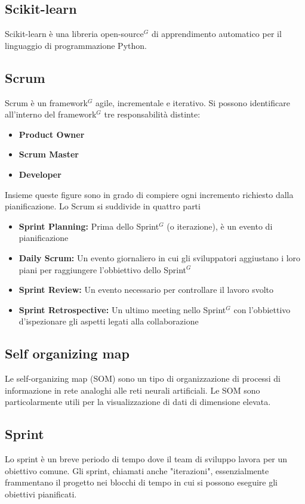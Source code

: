 \subsection{Scikit-learn}
Scikit-learn è una libreria open-source$^{G}$ di apprendimento automatico per il linguaggio di programmazione Python.

\subsection{Scrum}
Scrum è un framework$^{G}$ agile, incrementale e iterativo.\newline
Si possono identificare all'interno del framework$^{G}$ tre responsabilità distinte:
\begin{itemize}
    \item \textbf{Product Owner}
    \item \textbf{Scrum Master}
    \item \textbf{Developer}
\end{itemize}
Insieme queste figure sono in grado di compiere ogni incremento richiesto dalla pianificazione.
\newline
Lo Scrum si suddivide in quattro parti
\begin{itemize}
    \item \textbf{Sprint Planning:} Prima dello Sprint$^{G}$ (o iterazione), è un evento di pianificazione
    \item \textbf{Daily Scrum:} Un evento giornaliero in cui gli sviluppatori aggiustano i loro piani per raggiungere l'obbiettivo dello Sprint$^{G}$
    \item \textbf{Sprint Review:} Un evento necessario per controllare il lavoro svolto
    \item \textbf{Sprint Retrospective:} Un ultimo meeting nello Sprint$^{G}$ con l'obbiettivo d'ispezionare gli aspetti legati alla collaborazione
\end{itemize}

\subsection{Self organizing map}
Le self-organizing map (SOM) sono un tipo di organizzazione di processi di informazione in rete analoghi alle reti neurali artificiali. Le SOM sono particolarmente utili per la visualizzazione di dati di dimensione elevata.

\subsection{Sprint}
Lo sprint è un breve periodo di tempo dove il team di sviluppo lavora per un obiettivo comune. Gli sprint, chiamati anche
"iterazioni", essenzialmente frammentano il progetto nei blocchi di tempo in cui si possono eseguire gli obiettivi pianificati.

